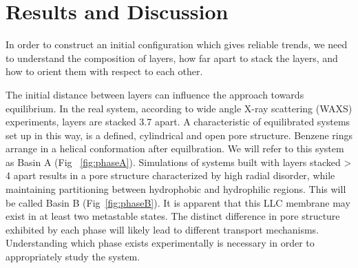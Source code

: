 \section{Results and Discussion}

In order to construct an initial configuration which gives reliable 
trends, we need to understand the composition of layers, how far apart
to stack the layers, and how to orient them with respect to each other.

The initial distance between layers can influence the approach towards
equilibrium. In the real system, according to wide angle X-ray
scattering (WAXS) experiments, layers are stacked 3.7 \angstrom apart.
A characteristic of equilibrated systems set up in this way, is a
defined, cylindrical and open pore structure. Benzene rings arrange in
a helical conformation after equilbration. We will refer to this system
as Basin A (Fig ~\ref{fig:phaseA}). Simulations of systems built with
layers stacked > 4 \angstrom apart results in a pore structure 
characterized by high radial disorder, while maintaining partitioning 
between hydrophobic and hydrophilic regions. This will be called Basin
B (Fig~\ref{fig:phaseB}).
It is apparent that this LLC membrane may exist in at least two
metastable states. The distinct difference in pore structure exhibited
by each phase will likely lead to different transport mechanisms.
Understanding which phase exists experimentally is necessary in order
to appropriately study the system.

